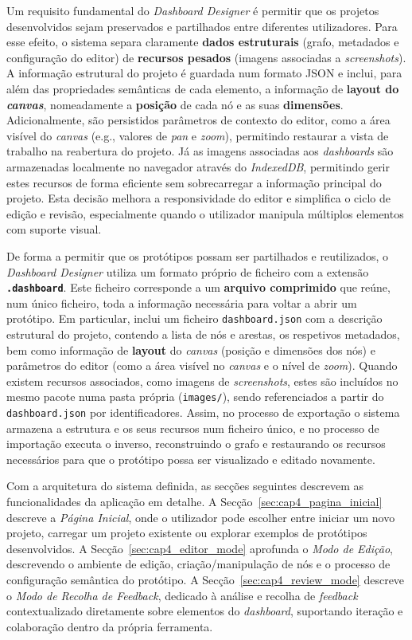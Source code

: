 Um requisito fundamental do \textit{Dashboard Designer} é permitir que os projetos desenvolvidos sejam preservados e partilhados entre diferentes utilizadores. Para esse efeito, o sistema separa claramente \textbf{dados estruturais} (grafo, metadados e configuração do editor) de \textbf{recursos pesados} (imagens associadas a \textit{screenshots}). A informação estrutural do projeto é guardada num formato JSON e inclui, para além das propriedades semânticas de cada elemento, a informação de \textbf{layout do \textit{canvas}}, nomeadamente a \textbf{posição} de cada nó e as suas \textbf{dimensões}. Adicionalmente, são persistidos parâmetros de contexto do editor, como a área visível do \textit{canvas} (e.g., valores de \textit{pan} e \textit{zoom}), permitindo restaurar a vista de trabalho na reabertura do projeto. Já as imagens associadas aos \textit{dashboards} são armazenadas localmente no navegador através do \textit{IndexedDB}, permitindo gerir estes recursos de forma eficiente sem sobrecarregar a informação principal do projeto. Esta decisão melhora a responsividade do editor e simplifica o ciclo de edição e revisão, especialmente quando o utilizador manipula múltiplos elementos com suporte visual.

De forma a permitir que os protótipos possam ser partilhados e reutilizados, o \textit{Dashboard Designer} utiliza um formato próprio de ficheiro com a extensão \textbf{\texttt{.dashboard}}. Este ficheiro corresponde a um \textbf{arquivo comprimido} que reúne, num único ficheiro, toda a informação necessária para voltar a abrir um protótipo. Em particular, inclui um ficheiro \texttt{dashboard.json} com a descrição estrutural do projeto, contendo a lista de nós e arestas, os respetivos metadados, bem como informação de \textbf{layout} do \textit{canvas} (posição e dimensões dos nós) e parâmetros do editor (como a área visível no \textit{canvas} e o nível de \textit{zoom}). Quando existem recursos associados, como imagens de \textit{screenshots}, estes são incluídos no mesmo pacote numa pasta própria (\texttt{images/}), sendo referenciados a partir do \texttt{dashboard.json} por identificadores. Assim, no processo de exportação o sistema armazena a estrutura e os seus recursos num ficheiro único, e no processo de importação executa o inverso, reconstruindo o grafo e restaurando os recursos necessários para que o protótipo possa ser visualizado e editado novamente.

Com a arquitetura do sistema definida, as secções seguintes descrevem as funcionalidades da aplicação em detalhe. A Secção~\ref{sec:cap4_pagina_inicial} descreve a \textit{Página Inicial}, onde o utilizador pode escolher entre iniciar um novo projeto, carregar um projeto existente ou explorar exemplos de protótipos desenvolvidos. A Secção~\ref{sec:cap4_editor_mode} aprofunda o \textit{Modo de Edição}, descrevendo o ambiente de edição, criação/manipulação de nós e o processo de configuração semântica do protótipo. A Secção~\ref{sec:cap4_review_mode} descreve o \textit{Modo de Recolha de Feedback}, dedicado à análise e recolha de \textit{feedback} contextualizado diretamente sobre elementos do \textit{dashboard}, suportando iteração e colaboração dentro da própria ferramenta.

